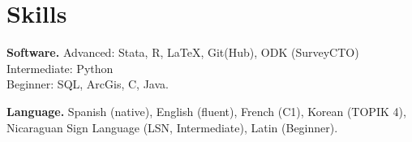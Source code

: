 \documentclass[a4paper, 10pt]{article}
\renewenvironment{itemize}{
  \begin{list}{}
    { \setlength{\itemsep}{5pt}
      \setlength{\parsep}{0pt}
      \setlength{\topsep}{0pt}
      \setlength{\leftmargin}{0em} } }{
  \end{list}}
\begin{document}


\section*{Skills}
\begin{itemize}
\item \textbf{Software.} \newline Advanced: Stata, R, \LaTeX, Git(Hub), ODK (SurveyCTO) \\
Intermediate: Python \\
Beginner: SQL, ArcGis, C, Java.
\item \textbf{Language.} \newline Spanish (native), English (fluent), French
(C1), Korean (TOPIK 4), Nicaraguan Sign Language (LSN, Intermediate), Latin
(Beginner).
\end{itemize}
\bigskip
\end{document}
